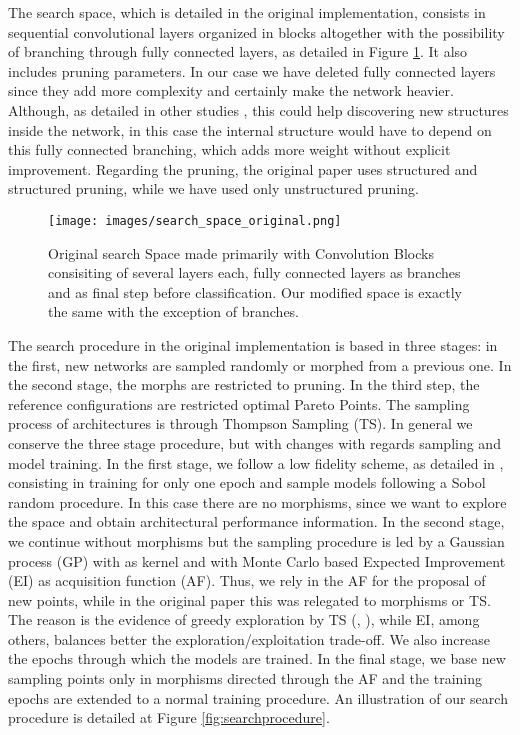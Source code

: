 \documentclass[a4paper, twocolumn]{article}
\begin{document}
The search space, which is detailed in the original implementation, consists in sequential convolutional layers organized in blocks altogether with the possibility of branching through fully connected layers, as detailed in Figure \ref{fig:searchspaceoriginal}. It also includes pruning parameters. In our case we have deleted fully connected layers since they add more complexity and certainly make the network heavier. Although, as detailed in other studies \cite{Frankle2019}, this could help discovering new structures inside the network, in this case the internal structure would have to depend on this fully connected branching, which adds more weight without explicit improvement. Regarding the pruning, the original paper uses structured and structured pruning, while we have used only unstructured pruning.

\begin{figure}
	\centering
	\texttt{[image: images/search\_space\_original.png]}
	\caption{Original search Space made primarily with Convolution Blocks consisiting of several layers each, fully connected layers as branches and as final step before classification. Our modified space is exactly the same with the exception of branches.}
	\label{fig:searchspaceoriginal}
\end{figure}


The search procedure in the original implementation is based in three stages: in the first, new networks are sampled randomly or morphed from a previous one. In the second stage, the morphs are restricted to pruning. In the third step, the reference configurations are restricted optimal Pareto Points. The sampling process of architectures is through Thompson Sampling (TS). In general we conserve the three stage procedure, but with changes with regards sampling and model training. In the first stage, we follow a low fidelity scheme, as detailed in \cite{Elsken2019b}, consisting in training for only one epoch and sample models following a Sobol random procedure. In this case there are no morphisms, since we want to explore the space and obtain architectural performance information. In the second stage, we continue without morphisms but the sampling procedure is led by a Gaussian process (GP) with \cite{Swersky2014} as kernel and with Monte Carlo based Expected Improvement (EI) as acquisition function (AF). Thus, we rely in the AF for the proposal of new points, while in the original paper this was relegated to morphisms or TS. The reason is the evidence of greedy exploration by TS (\cite{Shahriari2016}, \cite{Shahriari2014}), while EI, among others, balances better the exploration/exploitation trade-off. We also increase  the epochs through which the models are trained. In the final stage, we base new sampling points only in morphisms directed through the AF and the training epochs are extended to a normal training procedure. An illustration of our search procedure is detailed at Figure \ref{fig:searchprocedure}.
\end{document}
